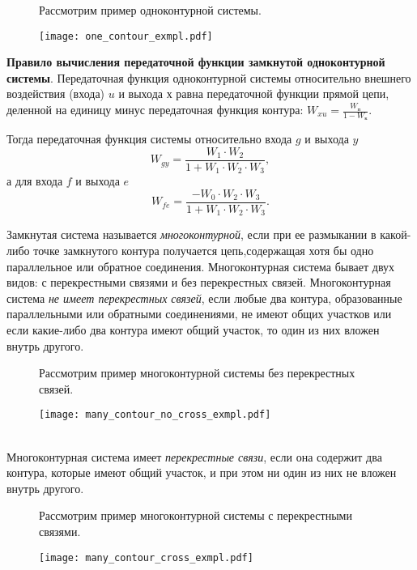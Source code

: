 \documentclass[../../TAU.tex]{subfiles}
\begin{document}
    \begin{figure}[h]
        \begin{minipage}[h]{0.29\linewidth}
            Рассмотрим пример одноконтурной системы.
            \vspace{3cm}
        \end{minipage}
        \begin{minipage}[h]{0.70\linewidth}
            \texttt{[image: one\_contour\_exmpl.pdf]}
        \end{minipage}
    \end{figure}
    {\bf Правило вычисления передаточной функции замкнутой одноконтурной системы}. 
    Передаточная функция одноконтурной системы относительно внешнего воздействия (входа) $u$ и выхода $х$ равна передаточной функции прямой цепи, деленной на единицу минус передаточная функция контура: $W_{xu}=\frac{W_\text{п}}{1-W_\text{к}}$.

    Тогда передаточная функция системы относительно входа $g$ и выхода $y$ 
    $$W_{gy}=\frac{W_1\cdot W_2}{1+W_1\cdot W_2\cdot W_3},$$
    а для входа $f$ и выхода $e$ 
    $$W_{fe}=\frac{-W_0\cdot W_2\cdot W_3}{1+W_1\cdot W_2\cdot W_3}.$$

     Замкнутая система называется {\it многоконтурной}, если при ее размыкании в какой-либо точке замкнутого контура получается цепь,содержащая хотя бы одно параллельное или обратное соединения. Многоконтурная система бывает двух видов: с перекрестными связями и без перекрестных связей.
    Многоконтурная система {\it не имеет перекрестных связей}, если любые два контура, образованные параллельными или обратными соединениями, не имеют общих участков или если какие-либо два контура имеют общий участок, то один из них вложен внутрь другого.
    \begin{figure}[h]
        \begin{minipage}[h]{0.19\linewidth}
            Рассмотрим пример многоконтурной системы без перекрестных связей.
            \vspace{3cm}
        \end{minipage}
        \begin{minipage}[h]{0.80\linewidth}
            \texttt{[image: many\_contour\_no\_cross\_exmpl.pdf]}
        \end{minipage}
    \end{figure}\\
    Многоконтурная система имеет {\it перекрестные связи}, если она содержит два контура, которые имеют общий участок, и при этом ни один из них не вложен внутрь другого.
    \begin{figure}[h]
        \begin{minipage}[h]{0.19\linewidth}
            Рассмотрим пример многоконтурной системы с перекрестными связями.
            \vspace{3cm}
        \end{minipage}
        \begin{minipage}[h]{0.80\linewidth}
            \texttt{[image: many\_contour\_cross\_exmpl.pdf]}
        \end{minipage}
    \end{figure}
\end{document}
